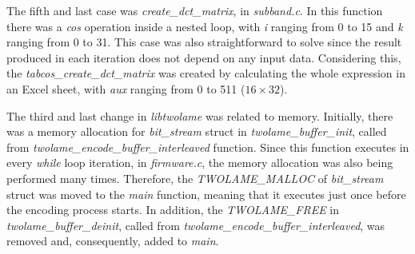 \begin{comment}
\begin{figure}[H]
\centerline{\texttt{[image: fft.pdf]}}
\caption{\textit{psycho\_3\_fft} function.}
\label{fft}
\end{figure}

\vspace{1cm}
\end{comment}

The fifth and last case was \textit{create\_dct\_matrix}, in \textit{subband.c}. In this function there was a \textit{cos} operation inside a nested loop, with \textit{i} ranging from 0 to 15 and \textit{k} ranging from 0 to 31. This case was also straightforward to solve since the result produced in each iteration does not depend on any input data. Considering this, the \textit{tabcos\_create\_dct\_matrix} was created by calculating the whole expression in an Excel sheet, with \textit{aux} ranging from 0 to 511 ($16 \times 32$).

\begin{comment}
\begin{figure}[H]
\centerline{\fbox{\texttt{[image: dct.pdf]}}}
\caption{\textit{create\_dct\_matrix} function.}
\label{dct}
\end{figure}

\vspace{1cm}
\end{comment}

The third and last change in \textit{libtwolame} was related to memory.
Initially, there was a memory allocation for \textit{bit\_stream} struct in \textit{twolame\_buffer\_init}, called from \textit{twolame\_encode\_buffer\_interleaved} function. Since this function executes in every \textit{while} loop iteration, in \textit{firmware.c}, the memory allocation was also being performed many times.
Therefore, the \textit{TWOLAME\_MALLOC} of \textit{bit\_stream} struct was moved to the \textit{main} function, meaning that it executes just once before the encoding process starts.
In addition, the \textit{TWOLAME\_FREE} in \textit{twolame\_buffer\_deinit}, called from \textit{twolame\_encode\_buffer\_interleaved}, was removed and, consequently, added to \textit{main}.



